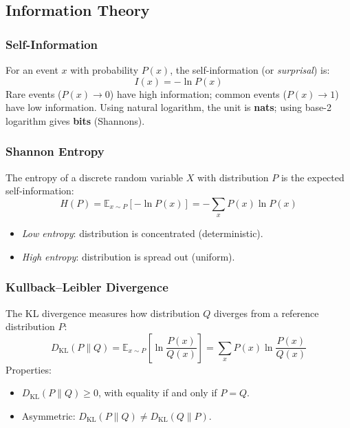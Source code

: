 \documentclass[11pt]{article}
\begin{document}
\subsection{Information Theory}

\subsubsection{Self-Information}

For an event $x$ with probability $P(x)$, the self-information (or \emph{surprisal}) is:
\[
    I(x) = -\ln P(x)
\]
Rare events ($P(x) \to 0$) have high information; common events ($P(x) \to 1$) have low information. Using natural logarithm, the unit is \textbf{nats}; using base-2 logarithm gives \textbf{bits} (Shannons).

\subsubsection{Shannon Entropy}

The entropy of a discrete random variable $X$ with distribution $P$ is the expected self-information:
\[
    H(P) = \mathbb{E}_{x \sim P}\!\left[-\ln P(x)\right] = -\sum_{x} P(x) \ln P(x)
\]
\begin{itemize}[leftmargin=2em]
    \item \emph{Low entropy}: distribution is concentrated (deterministic).
    \item \emph{High entropy}: distribution is spread out (uniform).
\end{itemize}

\subsubsection{Kullback--Leibler Divergence}

The KL divergence measures how distribution $Q$ diverges from a reference distribution $P$:
\[
    D_{\mathrm{KL}}(P \| Q) = \mathbb{E}_{x \sim P}\!\left[\ln \frac{P(x)}{Q(x)}\right]
                             = \sum_{x} P(x) \ln \frac{P(x)}{Q(x)}
\]
Properties:
\begin{itemize}[leftmargin=2em]
    \item $D_{\mathrm{KL}}(P \| Q) \geq 0$, with equality if and only if $P = Q$.
    \item Asymmetric: $D_{\mathrm{KL}}(P \| Q) \neq D_{\mathrm{KL}}(Q \| P)$.
\end{itemize}
\end{document}
